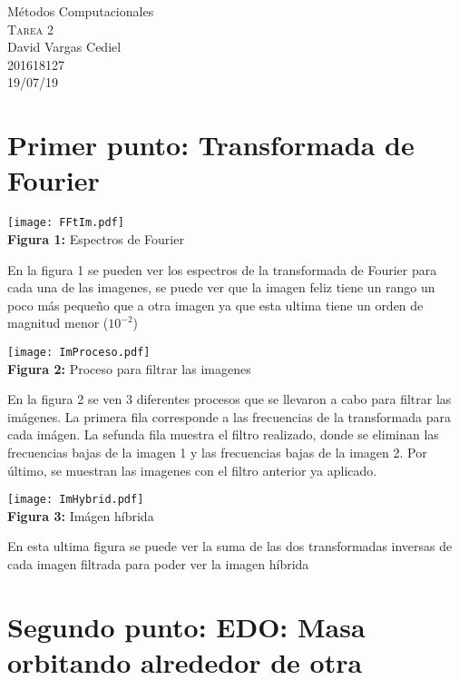 \documentclass[11pt,letterpaper]{exam}
\begin{document}
\begin{center}
{\Large Métodos Computacionales} \\
\textsc{Tarea 2}\\
{\large David Vargas Cediel}\\
201618127\\
19/07/19\\
\end{center}

\noindent
\section{Primer punto: Transformada de Fourier}
\begin{center}
\texttt{[image: FFtIm.pdf]}
\\
\textbf{Figura 1: }{Espectros de Fourier}
\end{center}

{En la figura 1 se pueden ver los espectros de la transformada de Fourier para cada una de las imagenes, se puede ver que la imagen feliz tiene un rango un poco más pequeño que a otra imagen ya que esta ultima tiene un orden de magnitud menor ($10^{-2}$)}


\begin{center}
\texttt{[image: ImProceso.pdf]}
\\
\textbf{Figura 2: }{Proceso para filtrar las imagenes}
\end{center}

{En la figura 2 se ven 3 diferentes procesos que se llevaron a cabo para filtrar las imágenes. La primera fila corresponde a las frecuencias de la transformada para cada imágen. La sefunda fila muestra el filtro realizado, donde se eliminan las frecuencias bajas de la imagen 1 y las frecuencias bajas de la imagen 2. Por último, se muestran las imagenes con el filtro anterior ya aplicado.}

\begin{center}
\texttt{[image: ImHybrid.pdf]} \\
\textbf{Figura 3: }{Imágen híbrida}
\end{center}
{En esta ultima figura se puede ver la suma de las dos transformadas inversas de cada imagen filtrada para poder ver la imagen híbrida}


\noindent
\section{Segundo punto: EDO: Masa orbitando alrededor de otra}
\end{document}
